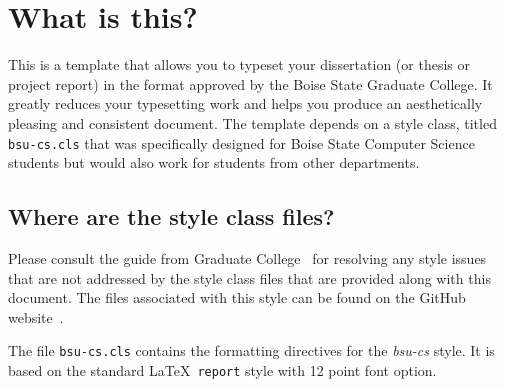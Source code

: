 \documentclass[dissertation, proposal]{bsu-cs}  %
\begin{document}
\label{ch:intro}

\section{What is this?}
This is a template that allows you to typeset your dissertation (or thesis or project report)
in the format approved by the Boise State Graduate College. It greatly reduces your typesetting
work and helps you produce an aesthetically pleasing and consistent document. The template
depends on a style class, titled \texttt{bsu-cs.cls} that was specifically designed for Boise
State Computer Science students but would also work for students from other departments.

\subsection{Where are the style class files?}



Please consult the guide from Graduate College~\cite{guide} for resolving any style issues
that are not addressed by the style class files that are provided along with this document. The
files associated with this style can be found on the GitHub website~\cite{mainrepo}.


The file \texttt{bsu-cs.cls} contains the formatting directives for the \emph{bsu-cs} style.
It is based on the standard \LaTeX\ \texttt{report} style with 12 point font option.
\end{document}
